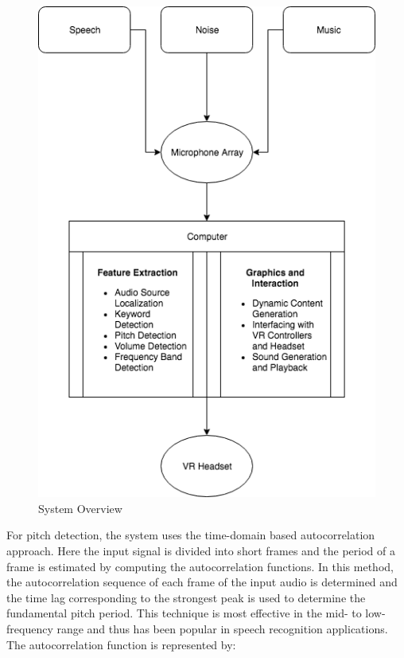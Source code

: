\documentclass[convention]{aesconf}
\begin{document}
\begin{figure}[ht!]
\includegraphics[width=\linewidth]{System_Diagram}
\caption{System Overview}
\label{auravr} %
\end{figure}

For pitch detection, the system uses the time-domain based autocorrelation approach. Here the input signal is divided into short frames and the period of a frame is estimated by computing the autocorrelation functions. In this method, the autocorrelation sequence of each frame of the input audio is determined and the time lag corresponding to the strongest peak is used to determine the fundamental pitch period. This technique is most effective in the mid- to low-frequency range and thus has been popular in speech recognition applications. The autocorrelation function is represented by: 
\end{document}
